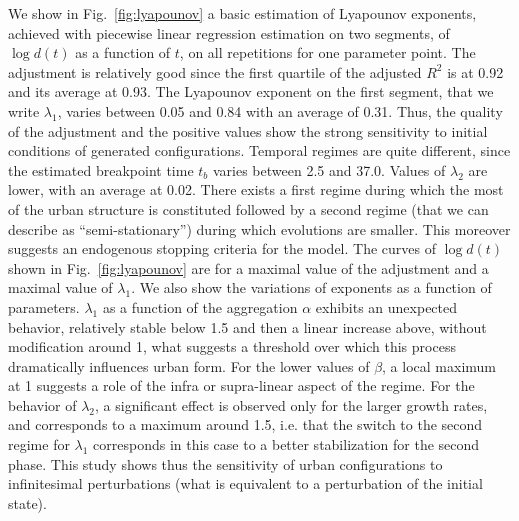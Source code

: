 \documentclass[11pt]{article}
\begin{document}
We show in Fig.~\ref{fig:lyapounov} a basic estimation of Lyapounov exponents, achieved with piecewise linear regression estimation on two segments, of $\log d(t)$ as a function of $t$, on all repetitions for one parameter point. The adjustment is relatively good since the first quartile of the adjusted $R^2$ is at 0.92 and its average at 0.93. The Lyapounov exponent on the first segment, that we write $\lambda_1$, varies between 0.05 and 0.84 with an average of 0.31. Thus, the quality of the adjustment and the positive values show the strong sensitivity to initial conditions of generated configurations. Temporal regimes are quite different, since the estimated breakpoint time $t_b$ varies between 2.5 and 37.0. Values of $\lambda_2$ are lower, with an average at 0.02. There exists a first regime during which the most of the urban structure is constituted followed by a second regime (that we can describe as ``semi-stationary'') during which evolutions are smaller. This moreover suggests an endogenous stopping criteria for the model. The curves of $\log d(t)$ shown in Fig.~\ref{fig:lyapounov} are for a maximal value of the adjustment and a maximal value of $\lambda_1$. We also show the variations of exponents as a function of parameters. $\lambda_1$ as a function of the aggregation $\alpha$ exhibits an unexpected behavior, relatively stable below 1.5 and then a linear increase above, without modification around 1, what suggests a threshold over which this process dramatically influences urban form. For the lower values of $\beta$, a local maximum at 1 suggests a role of the infra or supra-linear aspect of the regime. For the behavior of $\lambda_2$, a significant effect is observed only for the larger growth rates, and corresponds to a maximum around 1.5, i.e. that the switch to the second regime for $\lambda_1$ corresponds in this case to a better stabilization for the second phase. This study shows thus the sensitivity of urban configurations to infinitesimal perturbations (what is equivalent to a perturbation of the initial state).
\end{document}
